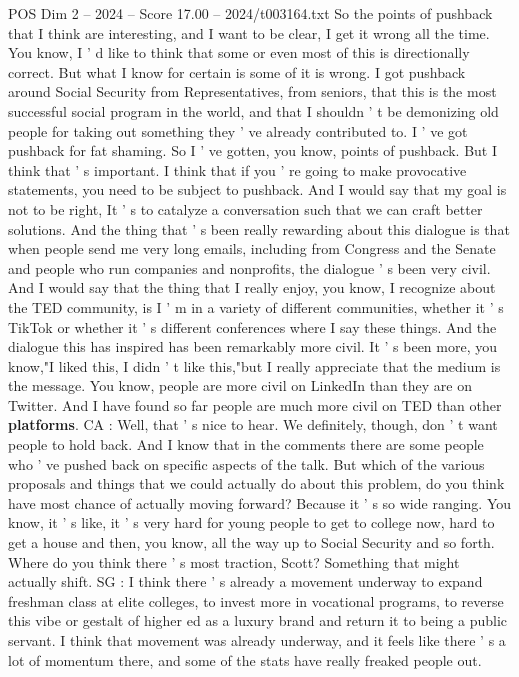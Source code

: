 \begin{textsample}{POS Dim 2 – 2024 – Score 17.00 – 2024/t003164.txt}
So the points of pushback that I think are interesting, and I want to be clear, I get it wrong all the time.
You know, I ' d like to think that some or even most of this is directionally correct.
But what I know for certain is some of it is wrong.
I got pushback around Social Security from Representatives, from seniors, that this is the most successful social program in the world, and that I shouldn ' t be demonizing old people for taking out something they ' ve already contributed to.
I ' ve got pushback for fat shaming.
So I ' ve gotten, you know, points of pushback.
But I think that ' s important.
I think that if you ' re going to make provocative statements, you need to be subject to pushback.
And I would say that my goal is not to be right, It ' s to catalyze a conversation such that we can craft better solutions.
And the thing that ' s been really rewarding about this dialogue is that when people send me very long emails, including from Congress and the Senate and people who run companies and nonprofits, the dialogue ' s been very civil.
And I would say that the thing that I really enjoy, you know, I recognize about the TED community, is I ' m in a variety of different communities, whether it ' s TikTok or whether it ' s different conferences where I say these things.
And the dialogue this has inspired has been remarkably more civil.
It ' s been more, you know,"I liked this, I didn ' t like this,"but I really appreciate that the medium is the message.
You know, people are more civil on LinkedIn than they are on Twitter.
And I have found so far people are much more civil on TED than other \textbf{platforms}.
CA : Well, that ' s nice to hear.
We definitely, though, don ' t want people to hold back.
And I know that in the comments there are some people who ' ve pushed back on specific aspects of the talk.
But which of the various proposals and things that we could actually do about this problem, do you think have most chance of actually moving forward?
Because it ' s so wide ranging.
You know, it ' s like, it ' s very hard for young people to get to college now, hard to get a house and then, you know, all the way up to Social Security and so forth.
Where do you think there ' s most traction, Scott?
Something that might actually shift.
SG : I think there ' s already a movement underway to expand freshman class at elite colleges, to invest more in vocational programs, to reverse this vibe or gestalt of higher ed as a luxury brand and return it to being a public servant.
I think that movement was already underway, and it feels like there ' s a lot of momentum there, and some of the stats have really freaked people out.

\end{textsample}
